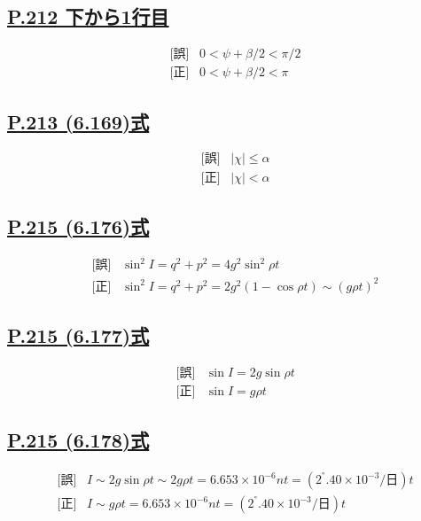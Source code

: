 \documentclass[9pt,fleqn]{bxjsarticle}
\begin{document}
\subsection*{\underline{P.212 下から1行目}}
\begin{align*}
    &\text{[誤]} \hspace{10pt} 0 < \psi + \beta/2 < \pi/2 \\
    &\text{[正]} \hspace{10pt} 0 < \psi + \beta/2 < \pi 
\end{align*}

\subsection*{\underline{P.213 (6.169)式}}
\begin{align*}
    &\text{[誤]} \hspace{10pt} |\chi|\leq\alpha \\
    &\text{[正]} \hspace{10pt} |\chi|<\alpha 
\end{align*}

\subsection*{\underline{P.215 (6.176)式}}
\begin{align*}
    &\text{[誤]} \hspace{10pt} \sin^2I = q^2 + p^2 = 4g^2\sin^2{\rho}t \\
    &\text{[正]} \hspace{10pt} \sin^2I = q^2 + p^2 = 2g^2(1-\cos{{\rho}t}) \sim (g{\rho}t)^2 
\end{align*}

\subsection*{\underline{P.215 (6.177)式}}
\begin{align*}
    &\text{[誤]} \hspace{10pt} \sin{I} = 2g\sin{{\rho}t} \\
    &\text{[正]} \hspace{10pt} \sin{I} = g{\rho}t
\end{align*}

\subsection*{\underline{P.215 (6.178)式}}
\begin{align*}
    &\text{[誤]} \hspace{10pt} I \sim 2g\sin{{\rho}t} \sim 2g{\rho}t = 6.653\times10^{-6}nt = (2^°.40\times10^{-3}/\text{日})t \\
    &\text{[正]} \hspace{10pt} I \sim g{\rho}t = 6.653\times10^{-6}nt = (2^°.40\times10^{-3}/\text{日})t 
\end{align*}
\end{document}
